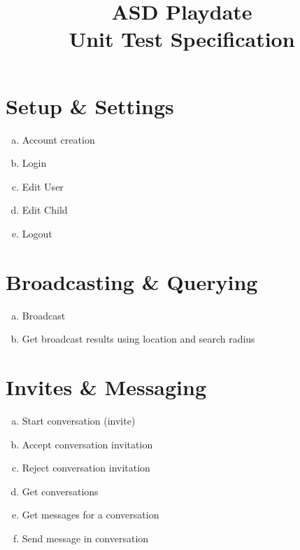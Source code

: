 \documentclass{article}
\begin{document}
\title{ASD Playdate\\Unit Test Specification}
\date{}
\maketitle


\section{Setup \& Settings}
	\begin{enumerate}[a.]
		\item Account creation
		\item Login
		\item Edit User
		\item Edit Child
		\item Logout
	\end{enumerate}

\section{Broadcasting \& Querying}
	\begin{enumerate}[a.]
		\item Broadcast
		\item Get broadcast results using location and search radius
	\end{enumerate}
\section{Invites \& Messaging}
	\begin{enumerate}[a.]
		\item Start conversation (invite)
		\item Accept conversation invitation
		\item Reject conversation invitation
		\item Get conversations
		\item Get messages for a conversation
		\item Send message in conversation
	\end{enumerate}
\end{document}
